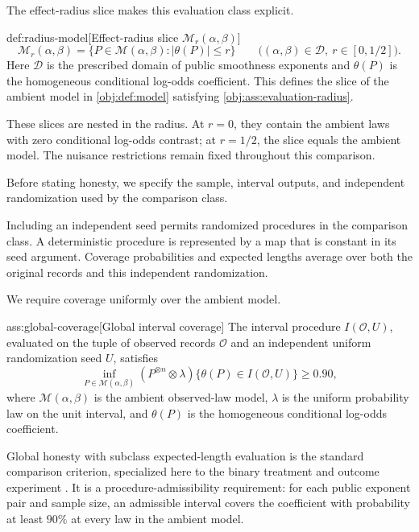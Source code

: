 \documentclass[11pt]{article}
\begin{document}
The effect-radius slice  makes this evaluation class explicit.

\begin{definitionv}{def:radius-model}[Effect-radius slice \(\mathcal M_r(\alpha,\beta)\)]
\[
\mathcal M_r(\alpha,\beta)
=
\{P\in\mathcal M(\alpha,\beta):|\theta(P)|\le r\}
\qquad
\bigl((\alpha,\beta)\in\mathcal D,\ r\in[0,1/2]\bigr).
\]
Here \(\mathcal D\) is the prescribed domain of public smoothness exponents and \(\theta(P)\) is the homogeneous conditional log-odds coefficient. This defines the slice of the ambient model in \cref{obj:def:model} satisfying \cref{obj:ass:evaluation-radius}.
\end{definitionv}

These slices are nested in the radius. At \(r=0\), they contain the ambient laws with zero conditional log-odds contrast; at \(r=1/2\), the slice equals the ambient model. The nuisance restrictions remain fixed throughout this comparison.

Before stating honesty, we specify the sample, interval outputs, and independent randomization used by the comparison class.



Including an independent seed permits randomized procedures in the comparison class. A deterministic procedure is represented by a map that is constant in its seed argument. Coverage probabilities and expected lengths average over both the original records and this independent randomization.

We require coverage uniformly over the ambient model.

\begin{assumptionv}{ass:global-coverage}[Global interval coverage]
The interval procedure \(I(\mathcal O,U)\), evaluated on the tuple of observed records \(\mathcal O\) and an independent uniform randomization seed \(U\), satisfies
\[
\inf_{P\in\mathcal M(\alpha,\beta)}
(P^{\otimes n}\otimes\lambda)
\{\theta(P)\in I(\mathcal O,U)\}\ge 0.90,
\]
where \(\mathcal M(\alpha,\beta)\) is the ambient observed-law model, \(\lambda\) is the uniform probability law on the unit interval, and \(\theta(P)\) is the homogeneous conditional log-odds coefficient.
\end{assumptionv}

Global honesty with subclass expected-length evaluation is the standard comparison criterion, specialized here to the binary treatment and outcome experiment \citep{CaiLow2004ConfidenceAdaptation}. It is a procedure-admissibility requirement: for each public exponent pair and sample size, an admissible interval covers the coefficient with probability at least \(90\%\) at every law in the ambient model.
\end{document}
